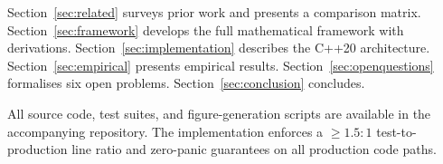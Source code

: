 Section~\ref{sec:related} surveys prior work and presents a comparison matrix.
Section~\ref{sec:framework} develops the full mathematical framework with
derivations.  Section~\ref{sec:implementation} describes the C++20 architecture.
Section~\ref{sec:empirical} presents empirical results.
Section~\ref{sec:openquestions} formalises six open problems.
Section~\ref{sec:conclusion} concludes.

All source code, test suites, and figure-generation scripts are available in
the accompanying repository.  The implementation enforces a $\geq 1.5:1$
test-to-production line ratio and zero-panic guarantees on all production code
paths.
